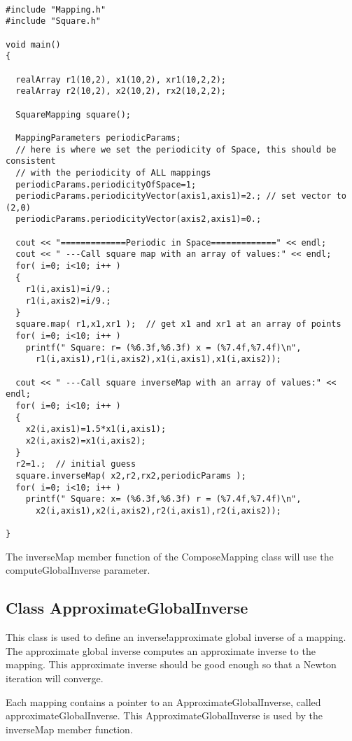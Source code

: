 \documentclass[xcolor=rgb,svgnames,dvipsnames]{article}
\newcommand{\Index}[1]{#1\index{#1}}
\begin{document}
{\footnotesize
\begin{verbatim}

#include "Mapping.h"
#include "Square.h"

void main()
{

  realArray r1(10,2), x1(10,2), xr1(10,2,2);
  realArray r2(10,2), x2(10,2), rx2(10,2,2);

  SquareMapping square();

  MappingParameters periodicParams;
  // here is where we set the periodicity of Space, this should be consistent
  // with the periodicity of ALL mappings
  periodicParams.periodicityOfSpace=1;
  periodicParams.periodicityVector(axis1,axis1)=2.; // set vector to (2,0)
  periodicParams.periodicityVector(axis2,axis1)=0.;

  cout << "=============Periodic in Space=============" << endl;
  cout << " ---Call square map with an array of values:" << endl;
  for( i=0; i<10; i++ )
  {
    r1(i,axis1)=i/9.; 
    r1(i,axis2)=i/9.; 
  }
  square.map( r1,x1,xr1 );  // get x1 and xr1 at an array of points
  for( i=0; i<10; i++ )
    printf(" Square: r= (%6.3f,%6.3f) x = (%7.4f,%7.4f)\n",
      r1(i,axis1),r1(i,axis2),x1(i,axis1),x1(i,axis2));

  cout << " ---Call square inverseMap with an array of values:" << endl;
  for( i=0; i<10; i++ )
  {
    x2(i,axis1)=1.5*x1(i,axis1); 
    x2(i,axis2)=x1(i,axis2); 
  }
  r2=1.;  // initial guess
  square.inverseMap( x2,r2,rx2,periodicParams );  
  for( i=0; i<10; i++ )
    printf(" Square: x= (%6.3f,%6.3f) r = (%7.4f,%7.4f)\n",
      x2(i,axis1),x2(i,axis2),r2(i,axis1),r2(i,axis2));

}
\end{verbatim}
}



The {\ff inverseMap} member function of the {\ff ComposeMapping} class will
use the {\ff computeGlobalInverse} parameter.

\subsection{Class ApproximateGlobalInverse}

This class is used to define an \Index{inverse!approximate global inverse} of a mapping.
The approximate global inverse computes an approximate inverse to the
mapping. This approximate inverse should be good enough so that a
Newton iteration will converge.

Each mapping contains a pointer to an ApproximateGlobalInverse, called
{\ff approximateGlobalInverse}. 
This ApproximateGlobalInverse is used by the {\ff inverseMap} member function.
\end{document}
